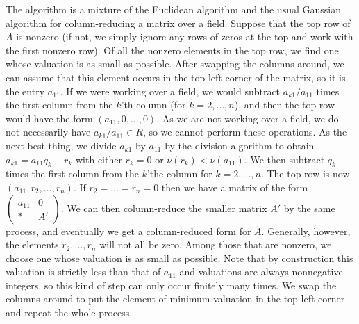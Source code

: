 \documentclass{amsart}
\newcommand{\blockmat}[4]{
 \left(\begin{array}{c|c} #1&#2 \\ \hline #3&#4\end{array}\right)}
\renewcommand{\:}{\colon}
\theoremstyle{definition}
\begin{document}
The algorithm is a mixture of the Euclidean algorithm and the usual
Gaussian algorithm for column-reducing a matrix over a field.  Suppose
that the top row of $A$ is nonzero (if not, we simply ignore any rows
of zeros at the top and work with the first nonzero row).  Of all the
nonzero elements in the top row, we find one whose valuation is as
small as possible.  After swapping the columns around, we can assume
that this element occurs in the top left corner of the matrix, so it
is the entry $a_{11}$.  If we were working over a field, we would
subtract $a_{k1}/a_{11}$ times the first column from the $k$'th column
(for $k=2,\ldots,n$), and then the top row would have the form
$(a_{11},0,\ldots,0)$.  As we are not working over a field, we do not
necessarily have $a_{k1}/a_{11}\in R$, so we cannot perform these
operations.  As the next best thing, we divide $a_{k1}$ by $a_{11}$ by
the division algorithm to obtain $a_{k1}=a_{11}q_k+r_k$ with either
$r_k=0$ or $\nu(r_k)<\nu(a_{11})$.  We then subtract $q_k$ times the
first column from the $k$'the column for $k=2,\ldots,n$.  The top row
is now $(a_{11},r_2,\ldots,r_n)$.  If $r_2=\ldots=r_n=0$ then we have
a matrix of the form $\blockmat{a_{11}}{0}{*}{A'}$.  We can then
column-reduce the smaller matrix $A'$ by the same process, and
eventually we get a column-reduced form for $A$.  Generally, however,
the elements $r_2,\ldots,r_n$ will not all be zero.  Among those that
are nonzero, we choose one whose valuation is as small as possible.
Note that by construction this valuation is strictly less than that of
$a_{11}$ and valuations are always nonnegative integers, so this kind
of step can only occur finitely many times.  We swap the columns
around to put the element of minimum valuation in the top left corner
and repeat the whole process.
\end{document}
